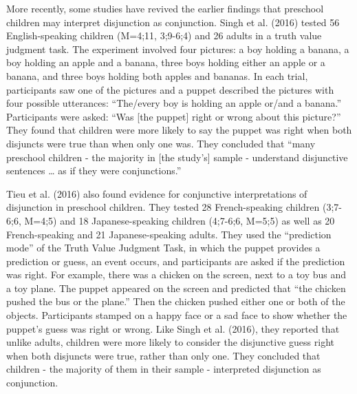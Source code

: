 \documentclass[floatsintext,man]{apa6}
\theoremstyle{definition}
\theoremstyle{definition}
\theoremstyle{definition}
\theoremstyle{remark}
\begin{document}
More recently, some studies have revived the earlier findings that
preschool children may interpret disjunction as conjunction. Singh et
al. (2016) tested 56 English-speaking children (M=4;11, 3;9-6;4) and 26
adults in a truth value judgment task. The experiment involved four
pictures: a boy holding a banana, a boy holding an apple and a banana,
three boys holding either an apple or a banana, and three boys holding
both apples and bananas. In each trial, participants saw one of the
pictures and a puppet described the pictures with four possible
utterances: \enquote{The/every boy is holding an apple or/and a banana.}
Participants were asked: \enquote{Was {[}the puppet{]} right or wrong
about this picture?} They found that children were more likely to say
the puppet was right when both disjuncts were true than when only one
was. They concluded that \enquote{many preschool children - the majority
in {[}the study's{]} sample - understand disjunctive sentences \ldots{}
as if they were conjunctions.}

Tieu et al. (2016) also found evidence for conjunctive interpretations
of disjunction in preschool children. They tested 28 French-speaking
children (3;7-6;6, M=4;5) and 18 Japanese-speaking children (4;7-6;6,
M=5;5) as well as 20 French-speaking and 21 Japanese-speaking adults.
They used the \enquote{prediction mode} of the Truth Value Judgment
Task, in which the puppet provides a prediction or guess, an event
occurs, and participants are asked if the prediction was right. For
example, there was a chicken on the screen, next to a toy bus and a toy
plane. The puppet appeared on the screen and predicted that \enquote{the
chicken pushed the bus or the plane.} Then the chicken pushed either one
or both of the objects. Participants stamped on a happy face or a sad
face to show whether the puppet's guess was right or wrong. Like Singh
et al. (2016), they reported that unlike adults, children were more
likely to consider the disjunctive guess right when both disjuncts were
true, rather than only one. They concluded that children - the majority
of them in their sample - interpreted disjunction as conjunction.
\end{document}
